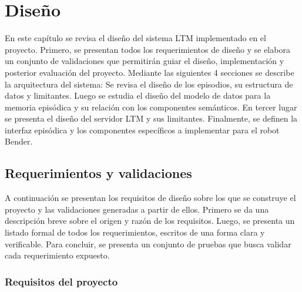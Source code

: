 \chapter{Diseño}\label{chapter:diseno}


En este capítulo se revisa el diseño del sistema LTM implementado en el proyecto. Primero, se presentan todos los requerimientos de diseño y se elabora un conjunto de validaciones que permitirán guiar el diseño, implementación y posterior evaluación del proyecto. Mediante las siguientes 4 secciones se describe la arquitectura del sistema: Se revisa el diseño de los episodios, su estructura de datos y limitantes. Luego se estudia el diseño del modelo de datos para la memoria episódica y su relación con los componentes semánticos. En tercer lugar se presenta el diseño del servidor LTM y sus limitantes. Finalmente, se definen la interfaz episódica y los componentes específicos a implementar para el robot Bender.




\section{Requerimientos y validaciones}

A continuación se presentan los requisitos de diseño sobre los que se construye el proyecto y las validaciones generadas a partir de ellos. Primero se da una descripción breve sobre el origen y razón de los requisitos. Luego, se presenta un listado formal de todos los requerimientos, escritos de una forma clara y verificable. Para concluir, se presenta un conjunto de pruebas que busca validar cada requerimiento expuesto.
 
\subsection{Requisitos del proyecto}



